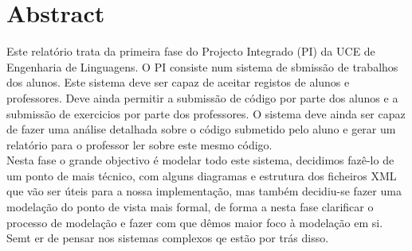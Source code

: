 \thispagestyle{plain}
\chapter*{Abstract}

Este relatório trata da primeira fase do Projecto Integrado (PI) da UCE de Engenharia de Linguagens. O PI consiste num sistema
de sbmissão de trabalhos dos alunos. Este sistema deve ser capaz de aceitar registos de alunos e professores. Deve ainda permitir a submissão
de código por parte dos alunos e a submissão de exercicios por parte dos professores. O sistema deve ainda ser capaz de fazer uma análise detalhada
sobre o código submetido pelo aluno e gerar um relatório para o professor ler sobre este mesmo código.\\

Nesta fase o grande objectivo é modelar todo este sistema, decidimos fazê-lo de um ponto de mais técnico, com alguns diagramas e estrutura dos ficheiros XML que vão
ser úteis para a nossa implementação, mas também decidiu-se fazer uma modelação do ponto de vista mais formal, de forma a nesta fase clarificar o processo de
modelação e fazer com que dêmos maior foco à modelação em si. Semt er de pensar nos sistemas complexos qe estão por trás disso.

